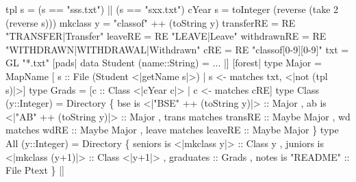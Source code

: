{
\begin{code}
tpl s = (s == "sss.txt") || (s == "sxx.txt")
cYear s = 
  toInteger (reverse (take 2 (reverse s)))
mkclass y = "classof" ++ (toString y)
\mbox{}
transferRE  = RE "TRANSFER|Transfer"
leaveRE     = RE "LEAVE|Leave"
withdrawnRE = RE "WITHDRAWN|WITHDRAWAL|Withdrawn"
cRE         = RE "classof[0-9][0-9]"
txt         = GL "*.txt"
\mbox{}
[pads|
  data Student (name::String) = ...
|]
\mbox{}
[forest|
  type Major = MapName  
    [ s :: File (Student <|getName s|>) 
    | s <- matches txt, <|not (tpl s)|>]
\mbox{}
  type Grads = 
    [c :: Class <|cYear c|> | c <- matches cRE]
\mbox{}
  type Class (y::Integer) = Directory
    \{ bse is <|"BSE" ++ (toString y)|> :: Major
    , ab  is <|"AB"  ++ (toString y)|> :: Major   
    , trans matches transRE :: Maybe Major      
    , wd matches wdRE :: Maybe Major
    , leave matches leaveRE :: Maybe Major 
    \}
\mbox{}
  type All (y::Integer) = Directory
    \{ seniors is <|mkclass y|> :: Class y
    , juniors is <|mkclass (y+1)|> :: Class <|y+1|>
    , graduates :: Grads
    , notes is "README" :: File Ptext
    \}
|]
\end{code}
}